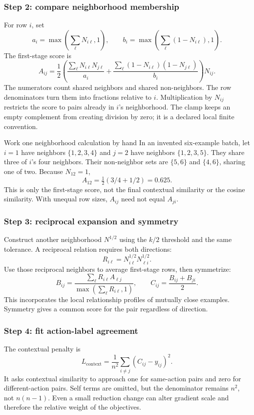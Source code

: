 \subsubsection*{Step 2: compare neighborhood membership}
For row $i$, set
\[
 a_i=\max\left(\sum_\ell N_{i\ell},1\right),\qquad
 b_i=\max\left(\sum_\ell(1-N_{i\ell}),1\right).
\]
The first-stage score is
\[
 A_{ij}=\frac12\left(
  \frac{\sum_\ell N_{i\ell}N_{j\ell}}{a_i}
 +\frac{\sum_\ell(1-N_{i\ell})(1-N_{j\ell})}{b_i}
 \right)N_{ij}.
\]
The numerators count shared neighbors and shared non-neighbors. The row
denominators turn them into fractions relative to $i$. Multiplication by
$N_{ij}$ restricts the score to pairs already in $i$'s neighborhood. The clamp
keeps an empty complement from creating division by zero; it is a declared
local finite convention.

\begin{concept}{Work one neighborhood calculation by hand}
In an invented six-example batch, let $i=1$ have neighbors $\{1,2,3,4\}$ and
$j=2$ have neighbors $\{1,2,3,5\}$. They share three of $i$'s four neighbors.
Their non-neighbor sets are $\{5,6\}$ and $\{4,6\}$, sharing one of two.
Because $N_{12}=1$,
\[
 A_{12}=\tfrac12(3/4+1/2)=0.625.
\]
This is only the first-stage score, not the final contextual similarity or
the cosine similarity. With unequal row sizes, $A_{ij}$ need not equal $A_{ji}$.
\end{concept}

\subsubsection*{Step 3: reciprocal expansion and symmetry}
Construct another neighborhood $N^{1/2}$ using the $k/2$ threshold and the
same tolerance. A reciprocal relation requires both directions:
\[
 R_{i\ell}=N^{1/2}_{i\ell}N^{1/2}_{\ell i}.
\]
Use those reciprocal neighbors to average first-stage rows, then symmetrize:
\[
 B_{ij}=\frac{\sum_\ell R_{i\ell}A_{\ell j}}
 {\max(\sum_\ell R_{i\ell},1)},\qquad
 C_{ij}=\frac{B_{ij}+B_{ji}}2.
\]
This incorporates the local relationship profiles of mutually close examples.
Symmetry gives a common score for the pair regardless of direction.

\subsubsection*{Step 4: fit action-label agreement}
The contextual penalty is
\[
 L_{\mathrm{context}}=\frac1{n^2}\sum_{i\ne j}(C_{ij}-y_{ij})^2.
\]
It asks contextual similarity to approach one for same-action pairs and zero
for different-action pairs. Self terms are omitted, but the denominator remains
$n^2$, not $n(n-1)$. Even a small reduction change can alter gradient scale and
therefore the relative weight of the objectives.

